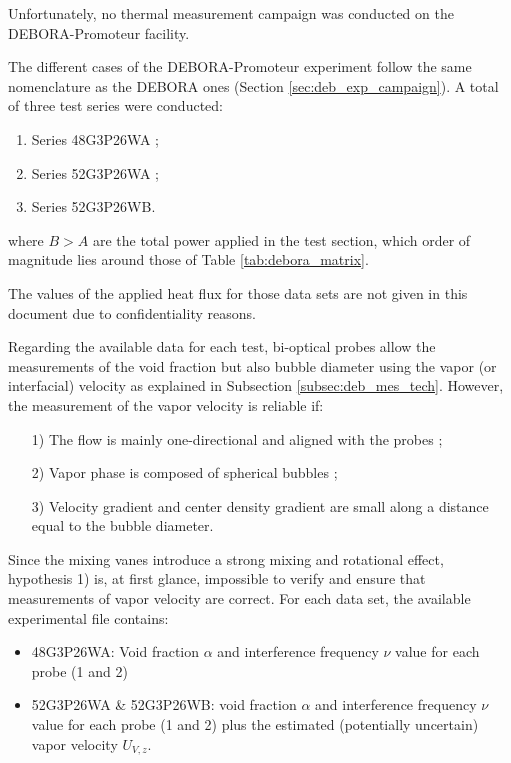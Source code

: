 \begin{note*}{}
Unfortunately, no thermal measurement campaign was conducted on the DEBORA-Promoteur facility.
\end{note*}

\npar


The different cases of the DEBORA-Promoteur experiment follow the same nomenclature as the DEBORA ones (Section \ref{sec:deb_exp_campaign}). A total of three test series were conducted:

\begin{enumerate}
\item Series 48G3P26WA ;
\item Series 52G3P26WA ; 
\item Series 52G3P26WB.
\end{enumerate}
where $B > A$ are the total power applied in the test section, which order of magnitude lies around those of Table \ref{tab:debora_matrix}.

\begin{note*}{}
The values of the applied heat flux for those data sets are not given in this document due to confidentiality reasons.
\end{note*}

\npar

Regarding the available data for each test, bi-optical probes allow the measurements of the void fraction but also bubble diameter using the vapor (or interfacial) velocity as explained in Subsection \ref{subsec:deb_mes_tech}. However, the measurement of the vapor velocity is reliable if:
\begin{enumerate}
\item[1)] The flow is mainly one-directional and aligned with the probes ;
\item[2)] Vapor phase is composed of spherical bubbles ;
\item[3)] Velocity gradient and center density gradient are small along a distance equal to the bubble diameter.
\end{enumerate}

Since the mixing vanes introduce a strong mixing and rotational effect, hypothesis 1) is, at first glance, impossible to verify and ensure that measurements of vapor velocity are correct. For each data set, the available experimental file contains:

\begin{itemize}
\item 48G3P26WA: Void fraction $\alpha$ and interference frequency $\nu$ value for each probe (1 and 2)
\item 52G3P26WA \& 52G3P26WB: void fraction $\alpha$ and interference frequency $\nu$ value for each probe (1 and 2) plus the estimated (potentially uncertain) vapor velocity $U_{V,z}$.
\end{itemize}


